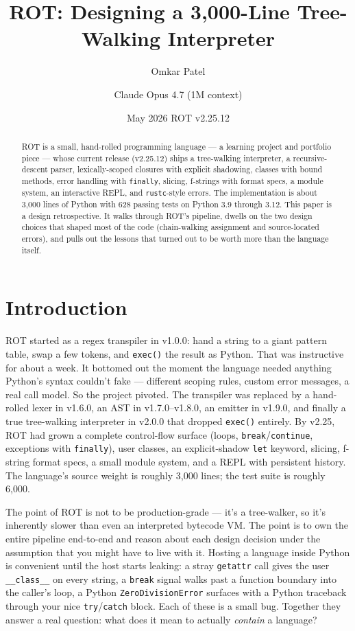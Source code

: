 \documentclass[11pt]{article}
\title{\textbf{ROT: Designing a 3{,}000-Line Tree-Walking Interpreter}}
\author{Omkar Patel \and Claude Opus 4.7 (1M context)}
\date{May 2026 \quad \textemdash \quad ROT v2.25.12}
\begin{document}
\maketitle

\begin{abstract}
\noindent
ROT is a small, hand-rolled programming language --- a learning project and portfolio piece --- whose current release (v2.25.12) ships a tree-walking interpreter, a recursive-descent parser, lexically-scoped closures with explicit shadowing, classes with bound methods, error handling with \texttt{finally}, slicing, f-strings with format specs, a module system, an interactive REPL, and \texttt{rustc}-style errors. The implementation is about 3{,}000 lines of Python with 628 passing tests on Python 3.9 through 3.12. This paper is a design retrospective. It walks through ROT's pipeline, dwells on the two design choices that shaped most of the code (chain-walking assignment and source-located errors), and pulls out the lessons that turned out to be worth more than the language itself.
\end{abstract}

\section{Introduction}

ROT started as a regex transpiler in v1.0.0: hand a string to a giant pattern table, swap a few tokens, and \texttt{exec()} the result as Python. That was instructive for about a week. It bottomed out the moment the language needed anything Python's syntax couldn't fake --- different scoping rules, custom error messages, a real call model. So the project pivoted. The transpiler was replaced by a hand-rolled lexer in v1.6.0, an AST in v1.7.0--v1.8.0, an emitter in v1.9.0, and finally a true tree-walking interpreter in v2.0.0 that dropped \texttt{exec()} entirely. By v2.25, ROT had grown a complete control-flow surface (loops, \texttt{break}/\texttt{continue}, exceptions with \texttt{finally}), user classes, an explicit-shadow \texttt{let} keyword, slicing, f-string format specs, a small module system, and a REPL with persistent history. The language's source weight is roughly 3{,}000 lines; the test suite is roughly 6{,}000.

The point of ROT is not to be production-grade --- it's a tree-walker, so it's inherently slower than even an interpreted bytecode VM. The point is to own the entire pipeline end-to-end and reason about each design decision under the assumption that you might have to live with it. Hosting a language inside Python is convenient until the host starts leaking: a stray \texttt{getattr} call gives the user \texttt{\_\_class\_\_} on every string, a \texttt{break} signal walks past a function boundary into the caller's loop, a Python \texttt{ZeroDivisionError} surfaces with a Python traceback through your nice \texttt{try}/\texttt{catch} block. Each of these is a small bug. Together they answer a real question: what does it mean to actually \emph{contain} a language?
\end{document}
